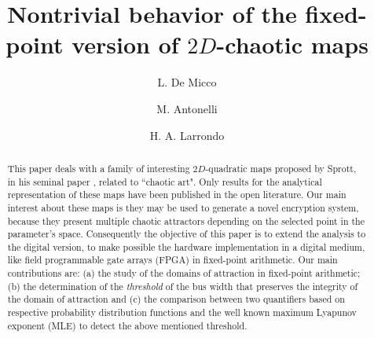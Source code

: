 \documentclass[manuscript, review, screen]{acmart}
\begin{document}
\title{Nontrivial behavior of the fixed-point version of $2D$-chaotic maps} 
\author{L. De Micco}

\author{M. Antonelli}
\author{H. A. Larrondo}
%  

\begin{abstract}
This paper deals with a family of interesting $2D$-quadratic maps
 proposed by Sprott, in his seminal paper \cite{Sprott1993},
related to ``chaotic art".  Only results for the analytical representation of these
maps have been published in the open literature. Our main interest about these maps is
they may be used to generate a novel encryption system, because
they present multiple chaotic attractors depending on the selected
point in the parameter's space. Consequently the objective of
this paper is to extend the analysis to the digital version, to make
possible  the hardware implementation in a digital medium, like field programmable gate arrays (FPGA) in fixed-point arithmetic.
Our main contributions are: (a) the study of the domains of attraction in fixed-point arithmetic; (b)  the determination of the \textsl{threshold} of the bus width that preserves the integrity of the domain of
attraction and (c) the comparison between two quantifiers based on respective probability distribution functions and  the well known maximum Lyapunov exponent (MLE) to detect the above mentioned threshold. 
\end{abstract}





%
\end{document}
